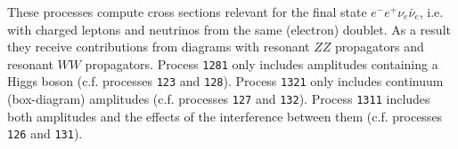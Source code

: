 
These processes compute cross sections relevant for the final state
$e^- e^+ \nu_e \bar \nu_e$, i.e. with charged leptons and neutrinos
from the same (electron) doublet.  As a result they receive
contributions from diagrams with resonant $ZZ$ propagators and
resonant $WW$ propagators.  Process {\tt 1281} only includes
amplitudes containing a Higgs boson (c.f. processes {\tt 123} and {\tt 128}).
Process {\tt 1321} only includes continuum (box-diagram)
amplitudes (c.f. processes {\tt 127} and {\tt 132}).  Process {\tt 1311}
includes both amplitudes and the effects of the interference
between them (c.f. processes {\tt 126} and {\tt 131}).

%
